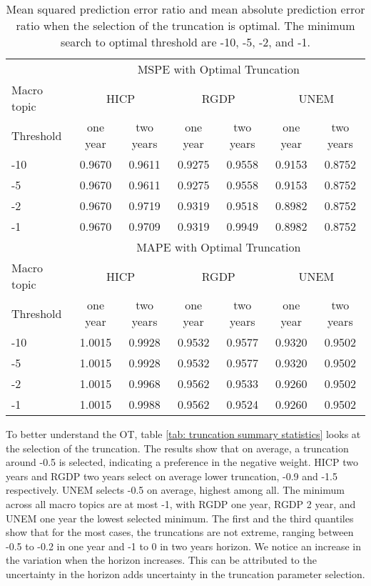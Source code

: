 \documentclass[11pt]{article}
\begin{document}
\begin{table}[!h]
	\centering
	\caption{Mean squared prediction error ratio and mean absolute prediction error ratio when the selection of the truncation is optimal. The minimum search to optimal threshold are -10, -5, -2, and -1.}
	\label{tab: oos mspe}
	\begin{tabular}{lcccccc}
		\hline
		&\multicolumn{6}{c}{MSPE with Optimal Truncation}\\
		\cmidrule(lr){2-7}
		Macro topic & \multicolumn{2}{c}{HICP} & \multicolumn{2}{c}{RGDP} & \multicolumn{2}{c}{UNEM} \\
		\cmidrule(lr){2-3} \cmidrule(lr){4-5}\cmidrule(lr){6-7}
		Threshold     & one year & two years & one year & two years & one year & two years \\ 
		\hline
		-10 & 0.9670   & 0.9611   & 0.9275   & 0.9558   & 0.9153   & 0.8752   \\ 
		-5  & 0.9670   & 0.9611   & 0.9275   & 0.9558   & 0.9153   & 0.8752   \\ 
		-2  & 0.9670   & 0.9719   & 0.9319   & 0.9518   & 0.8982   & 0.8752   \\ 
		-1  & 0.9670   & 0.9709   & 0.9319   & 0.9949   & 0.8982   & 0.8752   \\ 
		\hline
		&\multicolumn{6}{c}{MAPE with Optimal Truncation}\\
		\cmidrule(lr){2-7}
		Macro topic & \multicolumn{2}{c}{HICP} & \multicolumn{2}{c}{RGDP} & \multicolumn{2}{c}{UNEM} \\
		\cmidrule(lr){2-3} \cmidrule(lr){4-5}\cmidrule(lr){6-7}
		Threshold     & one year & two years & one year & two years & one year & two years \\ 
		\hline
		-10 & 1.0015   & 0.9928   & 0.9532   & 0.9577   & 0.9320   & 0.9502   \\
		-5  & 1.0015   & 0.9928   & 0.9532   & 0.9577   & 0.9320   & 0.9502   \\
		-2  & 1.0015   & 0.9968   & 0.9562   & 0.9533   & 0.9260   & 0.9502   \\
		-1  & 1.0015   & 0.9988   & 0.9562   & 0.9524   & 0.9260   & 0.9502   \\
		\hline
	\end{tabular}
\end{table}

To better understand the OT, table \ref{tab: truncation summary statistics} looks at the selection of the truncation. The results show that on average, a truncation around -0.5 is selected, indicating a preference in the negative weight. HICP two years and RGDP two years select on average lower truncation, -0.9 and -1.5 respectively. UNEM selects -0.5 on average, highest among all. The minimum across all macro topics are at most -1, with RGDP one year, RGDP 2 year, and UNEM one year the lowest selected minimum. The first and the third quantiles show that for the most cases, the truncations are not extreme, ranging between -0.5 to -0.2 in one year and -1 to 0 in two years horizon. We notice an increase in the variation when the horizon increases. This can be attributed to the uncertainty in the horizon adds uncertainty in the truncation parameter selection.
\end{document}
